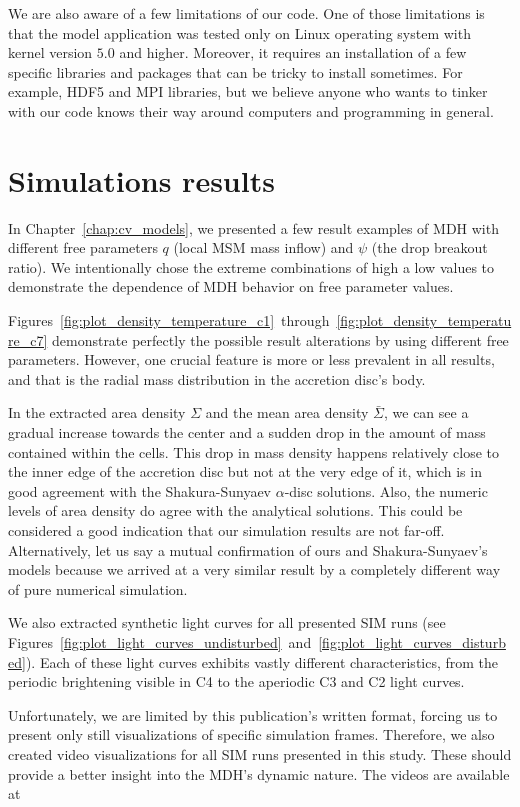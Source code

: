     We are also aware of a few limitations of our code. One of those limitations is that the model application was tested only on Linux operating system with kernel version $5.0$ and higher. Moreover, it requires an installation of a few specific libraries and packages that can be tricky to install sometimes. For example, HDF5 and MPI libraries, but we believe anyone who wants to tinker with our code knows their way around computers and programming in general.

\section{Simulations results}
    In Chapter~\ref{chap:cv_models}, we presented a few result examples of MDH with different free parameters $q$ (local MSM mass inflow) and $\psi$ (the drop breakout ratio). We intentionally chose the extreme combinations of high a low values to demonstrate the dependence of MDH behavior on free parameter values. 

    Figures~\ref{fig:plot_density_temperature_c1}~through~\ref{fig:plot_density_temperature_c7} demonstrate perfectly the possible result alterations by using different free parameters. However, one crucial feature is more or less prevalent in all results, and that is the radial mass distribution in the accretion disc's body. 

    In the extracted area density $\Sigma$ and the mean area density $\bar{\Sigma}$, we can see a gradual increase towards the center and a sudden drop in the amount of mass contained within the cells. This drop in mass density happens relatively close to the inner edge of the accretion disc but not at the very edge of it, which is in good agreement with the Shakura-Sunyaev $\alpha$-disc solutions. Also, the numeric levels of area density do agree with the analytical solutions. This could be considered a good indication that our simulation results are not far-off. Alternatively, let us say a mutual confirmation of ours and Shakura-Sunyaev's models because we arrived at a very similar result by a completely different way of pure numerical simulation.

    We also extracted synthetic light curves for all presented SIM runs (see Figures~\ref{fig:plot_light_curves_undisturbed}~and~\ref{fig:plot_light_curves_disturbed}). Each of these light curves exhibits vastly different characteristics, from the periodic brightening visible in C4 to the aperiodic C3 and C2 light curves.  

    Unfortunately, we are limited by this publication's written format, forcing us to present only still visualizations of specific simulation frames. Therefore, we also created video visualizations for all SIM runs presented in this study. These should provide a better insight into the MDH's dynamic nature. The videos are available at

